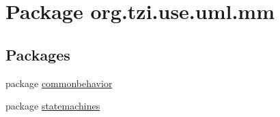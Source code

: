 \hypertarget{namespaceorg_1_1tzi_1_1use_1_1uml_1_1mm}{\section{Package org.\-tzi.\-use.\-uml.\-mm}
\label{namespaceorg_1_1tzi_1_1use_1_1uml_1_1mm}
}
\subsection*{Packages}
\begin{DoxyCompactItemize}
\item 
package \hyperlink{namespaceorg_1_1tzi_1_1use_1_1uml_1_1mm_1_1commonbehavior}{commonbehavior}
\item 
package \hyperlink{namespaceorg_1_1tzi_1_1use_1_1uml_1_1mm_1_1statemachines}{statemachines}
\end{DoxyCompactItemize}
